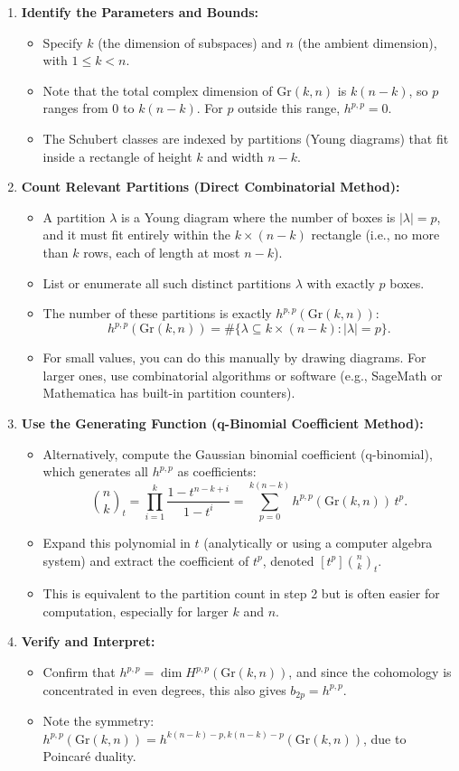 \documentclass{amsart}
\theoremstyle{plain}
\theoremstyle{definition}
\theoremstyle{remark}
\begin{document}
\begin{enumerate}
	\item \textbf{Identify the Parameters and Bounds:}
	\begin{itemize}
		\item Specify $k$ (the dimension of subspaces) and $n$ (the ambient dimension), with $1 \leq k < n$.
		\item Note that the total complex dimension of $\mathrm{Gr}(k,n)$ is $k(n-k)$, so $p$ ranges from 0 to $k(n-k)$. For $p$ outside this range, $h^{p,p} = 0$.
		\item The Schubert classes are indexed by partitions (Young diagrams) that fit inside a rectangle of height $k$ and width $n-k$.
	\end{itemize}
	\item \textbf{Count Relevant Partitions (Direct Combinatorial Method):}
	\begin{itemize}
		\item A partition $\lambda$ is a Young diagram where the number of boxes is $|\lambda| = p$, and it must fit entirely within the $k \times (n-k)$ rectangle (i.e., no more than $k$ rows, each of length at most $n-k$).
		\item List or enumerate all such distinct partitions $\lambda$ with exactly $p$ boxes.
		\item The number of these partitions is exactly $h^{p,p}(\mathrm{Gr}(k,n))$:
\[
h^{p,p}(\mathrm{Gr}(k,n)) = \#\{\lambda \subseteq k \times (n-k) : |\lambda| = p\}.
\]		\item For small values, you can do this manually by drawing diagrams. For larger ones, use combinatorial algorithms or software (e.g., SageMath or Mathematica has built-in partition counters).
	\end{itemize}
	\item \textbf{Use the Generating Function (q-Binomial Coefficient Method):}
	\begin{itemize}
		\item Alternatively, compute the Gaussian binomial coefficient (q-binomial), which generates all $h^{p,p}$ as coefficients:
\[
\binom{n}{k}_t = \prod_{i=1}^{k} \frac{1 - t^{n-k+i}}{1 - t^i} = \sum_{p=0}^{k(n-k)} h^{p,p}(\mathrm{Gr}(k,n)) \, t^p.
\]		\item Expand this polynomial in $t$ (analytically or using a computer algebra system) and extract the coefficient of $t^p$, denoted $[t^p] \binom{n}{k}_t$.
		\item This is equivalent to the partition count in step 2 but is often easier for computation, especially for larger $k$ and $n$.
	\end{itemize}
	\item \textbf{Verify and Interpret:}
	\begin{itemize}
		\item Confirm that $h^{p,p} = \dim H^{p,p}(\mathrm{Gr}(k,n))$, and since the cohomology is concentrated in even degrees, this also gives $b_{2p} = h^{p,p}$.
		\item Note the symmetry: $h^{p,p}(\mathrm{Gr}(k,n)) = h^{k(n-k)-p, k(n-k)-p}(\mathrm{Gr}(k,n))$, due to Poincaré duality.
	\end{itemize}
\end{enumerate}
\end{document}
